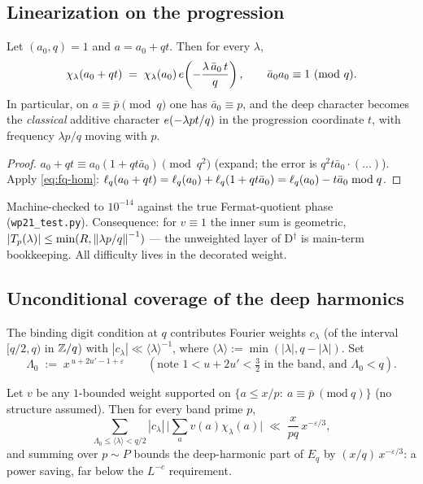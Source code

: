 \subsection{Linearization on the progression}

\begin{lemma}[linearization]\label{lem:linearization}
\statusPM\quad
Let $(a_0,q)=1$ and $a=a_0+qt$. Then for every $\lambda$,
\[
\chi_\lambda(a_0+qt)\;=\;\chi_\lambda(a_0)\,
e\!\left(-\frac{\lambda\,\bar a_0\,t}{q}\right),
\qquad \bar a_0a_0\equiv1\ (\mathrm{mod}\ q).
\]
In particular, on $a\equiv\bar p\pmod q$ one has $\bar a_0\equiv p$, and
the deep character becomes the \emph{classical} additive character
$e\!\left(-\lambda pt/q\right)$ in the progression coordinate $t$, with frequency
$\lambda p/q$ moving with $p$.
\end{lemma}

\begin{proof}
$a_0+qt\equiv a_0(1+qt\bar a_0)\pmod{q^2}$ (expand; the error is
$q^2t\bar a_0\cdot(\ldots)$). Apply \eqref{eq:fq-hom}:
$\ell_q(a_0+qt)=\ell_q(a_0)+\ell_q(1+qt\bar a_0)=\ell_q(a_0)-t\bar a_0\bmod q$.
\end{proof}

\begin{remark}
Machine-checked to $10^{-14}$ against the true Fermat-quotient phase
(\texttt{wp21\_test.py}). Consequence: for $v\equiv1$ the inner sum is
geometric, $|T_p(\lambda)|\le\min(R,\left\| \lambda p/q\right\|^{-1})$ --- the
unweighted layer of D$^\dagger$ is main-term bookkeeping. All difficulty
lives in the decorated weight.
\end{remark}

\subsection{Unconditional coverage of the deep harmonics}

The binding digit condition at $q$ contributes Fourier weights
$c_\lambda$ (of the interval $[q/2,q)$ in $\mathbb{Z}/q$) with
$|c_\lambda|\ll\langle\lambda\rangle^{-1}$, where
$\langle\lambda\rangle:=\min(|\lambda|,q-|\lambda|)$. Set
\[
\Lambda_0\;:=\;x^{\,u+2u'-1+\varepsilon}
\qquad(\text{note }1<u+2u'<\tfrac32\text{ in the band, and }\Lambda_0<q).
\]

\begin{proposition}\label{prop:largelambda}
\statusP\quad
Let $v$ be any $1$-bounded weight supported on
$\{a\le x/p:\ a\equiv\bar p\ (\mathrm{mod}\ q)\}$ (no structure assumed).
Then for every band prime $p$,
\[
\sum_{\Lambda_0\le\langle\lambda\rangle<q/2}|c_\lambda|\,
\Big|\sum_{a}v(a)\chi_\lambda(a)\Big|
\;\ll\;\frac{x}{pq}\,x^{-\varepsilon/3},
\]
and summing over $p\sim P$ bounds the deep-harmonic part of
$E_q$ by $(x/q)\,x^{-\varepsilon/3}$: a power saving, far below the
$L^{-c}$ requirement.
\end{proposition}

